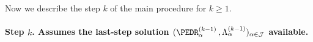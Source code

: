 %
%
%
%	
%


Now we describe the step \( k \) of the main procedure for \( k \geq 1 \).


\paragraph{Step \( k \). Assumes the last-step solution 
\( (\PEDR_{\jl}^{(k-1)} \, , \Lambda_{\jl}^{(k-1)} )_{\jl \in \JJJ} \) available.}


